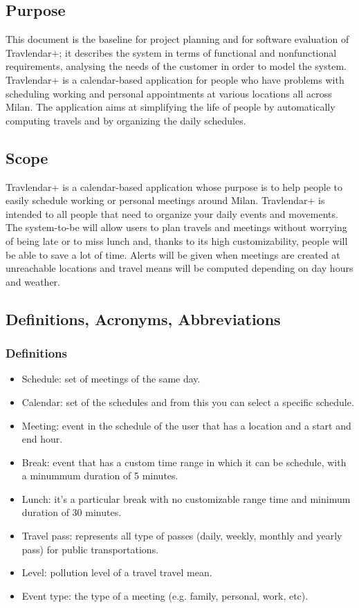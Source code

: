\subsection{Purpose}
This document is the baseline for project planning and for software evaluation of Travlendar+; it describes the system in terms of functional and nonfunctional requirements, analysing the needs of the customer in order to model the system.\\
Travlendar+ is a calendar-based application for people who have problems with scheduling working and personal appointments at various locations all across Milan. The application aims at simplifying the life of people by automatically computing travels and by organizing the daily schedules.

\subsection{Scope}
Travlendar+ is a calendar-based application whose purpose is to help people to easily schedule working or personal meetings around Milan.
Travlendar+ is intended to all people that need to organize your daily events and movements. The system-to-be will allow users to plan travels and meetings without worrying of being late or to miss lunch and, thanks to its high customizability, people will be able to save a lot of time. Alerts will be given when meetings are created at unreachable locations and travel means will be computed depending on day hours and weather.

\subsection{Definitions, Acronyms, Abbreviations}

\subsubsection{Definitions}
\renewcommand{\labelitemi}{$-$}
\begin{itemize}
\item
Schedule: set of meetings of the same day.
\item
Calendar: set of the schedules and from this you can select a specific schedule.
\item
Meeting: event in the schedule of the user that has a location and a start and end hour.
\item
Break: event that has a custom time range in which it can be schedule, with a minummum duration of 5 minutes.
\item
Lunch: it's a particular break with no customizable range time and minimum duration of 30 minutes.
\item
Travel pass: represents all type of passes (daily, weekly, monthly and yearly pass) for public transportations.
\item
Level: pollution level of a travel travel mean. 
\item
Event type: the type of a meeting (e.g. family, personal, work, etc). 
\end{itemize}


